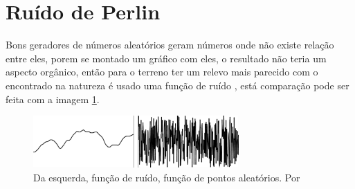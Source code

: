 %

\section{Ruído de Perlin}
Bons geradores de números aleatórios geram números onde não existe relação entre
eles, porem se montado um gráfico com eles, o resultado não teria um aspecto
orgânico, então para o terreno ter um relevo mais parecido com o encontrado na 
natureza é usado uma função de ruído \cite{shiffman2012nature}, está comparação
pode ser feita com a imagem \ref{fig:randomAndNoise}. 
\begin{figure}[H]
    \centering
    \includegraphics[width=0.7\textwidth]{figuras/randomAndNoise.png}
    \caption{Da esquerda, função de ruído, função de pontos aleatórios. Por \cite{shiffman2012nature}}
    \label{fig:randomAndNoise}
\end{figure}


